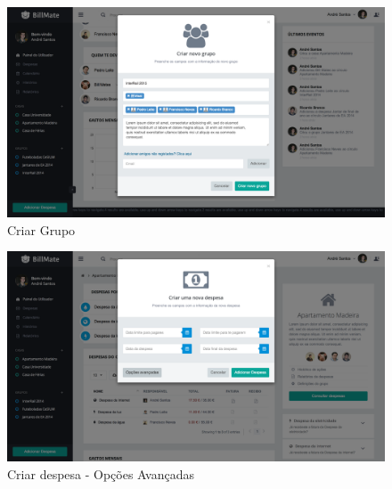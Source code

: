 \begin{referenciaswww}
\begin{figure}[ht]
{
\includegraphics[width=.5\textwidth]{images/andre/create_collective}
\caption{Criar Grupo}
}
\end{figure}

\begin{figure}[ht]
{
\includegraphics[width=.5\textwidth]{images/andre/cexpadv}
\caption{Criar despesa - Opções Avançadas}
}
\end{figure}


\end{referenciaswww}
